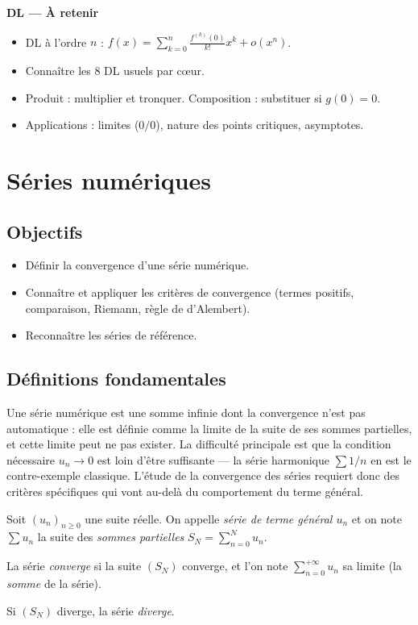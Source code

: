 \documentclass[11pt,a4paper,twoside]{book}
\begin{document}
\begin{retenirbox}
\textbf{DL — À retenir}
\begin{itemize}
  \item DL à l'ordre $n$ : $f(x) = \sum_{k=0}^n \frac{f^{(k)}(0)}{k!}x^k + o(x^n)$.
  \item Connaître les 8 DL usuels par cœur.
  \item Produit : multiplier et tronquer. Composition : substituer si $g(0)=0$.
  \item Applications : limites ($0/0$), nature des points critiques, asymptotes.
\end{itemize}
\end{retenirbox}

\chapter{Séries numériques}

\section*{Objectifs}
\begin{itemize}[leftmargin=1.5em]
  \item Définir la convergence d'une série numérique.
  \item Connaître et appliquer les critères de convergence (termes positifs, comparaison, Riemann, règle de d'Alembert).
  \item Reconnaître les séries de référence.
\end{itemize}

\section{Définitions fondamentales}

Une série numérique est une somme infinie dont la convergence n'est pas automatique : elle est définie comme la limite de la suite de ses sommes partielles, et cette limite peut ne pas exister. La difficulté principale est que la condition nécessaire $u_n \to 0$ est loin d'être suffisante — la série harmonique $\sum 1/n$ en est le contre-exemple classique. L'étude de la convergence des séries requiert donc des critères spécifiques qui vont au-delà du comportement du terme général.

\begin{definitionbox}
Soit $(u_n)_{n \geq 0}$ une suite réelle.
On appelle \emph{série de terme général $u_n$} et on note $\sum u_n$ la suite des
\emph{sommes partielles} $S_N = \sum_{n=0}^N u_n$.

La série \emph{converge} si la suite $(S_N)$ converge, et l'on note $\sum_{n=0}^{+\infty} u_n$
sa limite (la \emph{somme} de la série).

Si $(S_N)$ diverge, la série \emph{diverge}.
\end{definitionbox}
\end{document}
